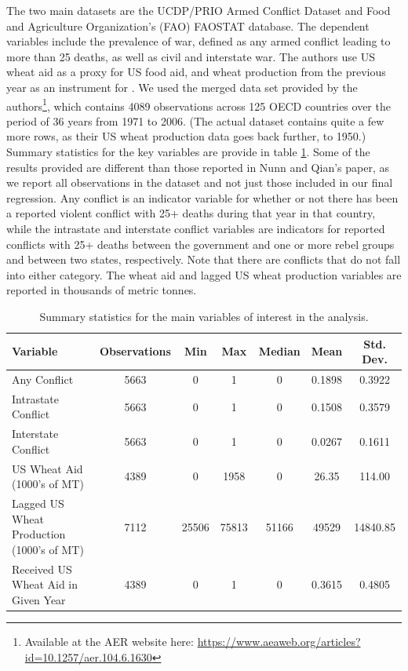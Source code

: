 \documentclass{article}
\begin{document}
The two main datasets are the UCDP/PRIO Armed Conflict Dataset and Food and Agriculture Organization’s (FAO) FAOSTAT database. The dependent variables include the prevalence of war, defined as any armed conflict leading to more than 25 deaths, as well as civil and interstate war. The authors use US wheat aid as a proxy for US food aid, and wheat production from the previous year as an instrument for . We used the merged data set provided by the authors\footnote{Available at the AER website here: \href{https://www.aeaweb.org/articles?id=10.1257/aer.104.6.1630}{https://www.aeaweb.org/articles?id=10.1257/aer.104.6.1630}}, which contains 4089 observations across 125 OECD countries over the period of 36 years from 1971 to 2006. (The actual dataset contains quite a few more rows, as their US wheat production data goes back further, to 1950.) \\

Summary statistics for the key variables are provide in table \ref{summary}. Some of the results provided are different than those reported in Nunn and Qian's paper, as we report all observations in the dataset and not just those included in our final regression. Any conflict is an indicator variable for whether or not there has been a reported violent conflict with 25+ deaths during that year in that country, while the intrastate and interstate conflict variables are indicators for reported conflicts with 25+ deaths between the government and one or more rebel groups and between two states, respectively. Note that there are conflicts that do not fall into either category. The wheat aid and lagged US wheat production variables are reported in thousands of metric tonnes. 
\begin{table}[t]
\centering
\begin{tabular}{| l | c | c | c | c | c | c | }
\hline
Variable & Observations & Min & Max & Median & Mean & Std. Dev.\\
\hline
Any Conflict & 5663 & 0 & 1 & 0 & 0.1898 & 0.3922 \\
Intrastate Conflict & 5663 & 0 & 1 & 0 & 0.1508 & 0.3579\\
Interstate Conflict & 5663 & 0 & 1 & 0 & 0.0267 & 0.1611\\
\hline
US Wheat Aid (1000's of MT) & 4389 & 0 & 1958 & 0 & 26.35 & 114.00\\
Lagged US Wheat Production (1000's of MT) & 7112 & 25506 & 75813   & 51166 & 49529 & 14840.85\\
Received US Wheat Aid in Given Year &4389 &  0 & 1 & 0 & 0.3615 & 0.4805\\
\hline 
\end{tabular}
\label{summary}
\caption{Summary statistics for the main variables of interest in the analysis. }
\end{table}
\end{document}
